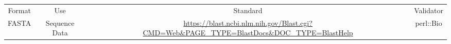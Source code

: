 \begin{tabular}{cccc}
{Format} & {Use} & {Standard} & {Validator} \\
FASTA & Sequence Data & \url{https://blast.ncbi.nlm.nih.gov/Blast.cgi?CMD=Web&PAGE_TYPE=BlastDocs&DOC_TYPE=BlastHelp} & perl::Bio\\

\end{tabular}